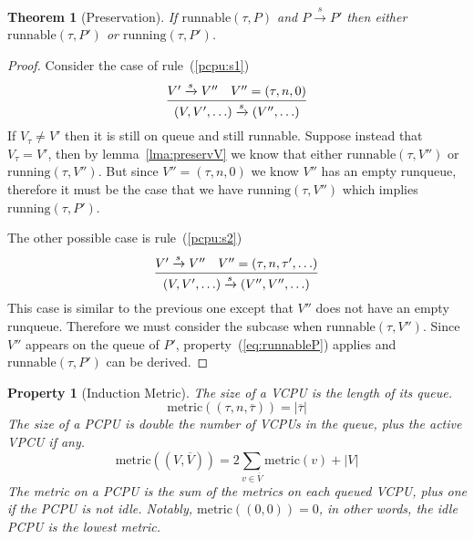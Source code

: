 \documentclass{article}
\newcommand\paren[1]{\left( {#1} \right)}
\newcommand\len[1]{\left| {#1} \right|}
\newcommand\sched{\xrightarrow{s}}
\newcommand\vcpu[1]{\paren{#1}}
\newcommand\pcpu[1]{\paren{#1}}
\newcommand\running[1]{\ensuremath{\text{running}\paren{#1}}}
\newcommand\runnable[1]{\ensuremath{\text{runnable}\paren{#1}}}
\newtheorem{thm}{Theorem}
\newtheorem{prop}{Property}
\begin{document}
\begin{thm}[Preservation]\label{thm:preserv}
  If \runnable{\tau,P} and $P\sched P'$ then either \runnable{\tau,P'}
  or \running{\tau, P'}.
\end{thm}
\begin{proof}
  Consider the case of rule~(\ref{pcpu:s1})
  \begin{equation*}
    \infer{\pcpu{V,V',\ldots}\sched\pcpu{V'',\ldots}}{
      V'\sched V'' & V''=(\tau, n, 0)
    }
  \end{equation*}
  If $V_{\tau}\neq V'$ then it is still on queue and still runnable.
  Suppose instead that $V_{\tau}=V'$, then by lemma~\ref{lma:preservV}
  we know that either \runnable{\tau,V''} or \running{\tau,V''}.  But
  since $V''=\vcpu{\tau,n,0}$ we know $V''$ has an empty runqueue,
  therefore it must be the case that we have $\running{\tau,V''}$
  which implies $\running{\tau,P'}$.

  The other possible case is rule~(\ref{pcpu:s2})
  \begin{equation*}
    \infer{\pcpu{V,V',\ldots}\sched\pcpu{V'',V'',\ldots}}{
      V'\sched V'' & V''=(\tau, n, \tau', \ldots)
    }
  \end{equation*}
  This case is similar to the previous one except that $V''$ does not
  have an empty runqueue.  Therefore we must consider the subcase when
  $\runnable{\tau,V''}$.  Since $V''$ appears on the queue of $P'$,
  property~(\ref{eq:runnableP}) applies and \runnable{\tau,P'} can be derived.
\end{proof}

\newcommand\metric[1]{\ensuremath{\text{metric}\paren{#1}}}
\renewcommand\bar\overline
\begin{prop}[Induction Metric]
  The size of a VCPU is the length of its queue.
  \begin{equation}
    \label{eq:metric}
    \metric{(\tau,n,\bar\tau)}={\len{\bar\tau}}
  \end{equation}
  The size of a PCPU is double the number of VCPUs in the queue, plus
  the active VPCU if any.
  \begin{equation}
    \label{eq:metric}
    \metric{(V,\bar V)}=2\sum_{v\in\bar V}{\metric{v}}+\len V
  \end{equation}
  The metric on a PCPU is the sum of the metrics on each queued VCPU,
  plus one if the PCPU is not idle.  Notably,
  $\metric{(0,0)}=0$, in other words, the idle PCPU is the lowest
  metric.
\end{prop}
\end{document}
